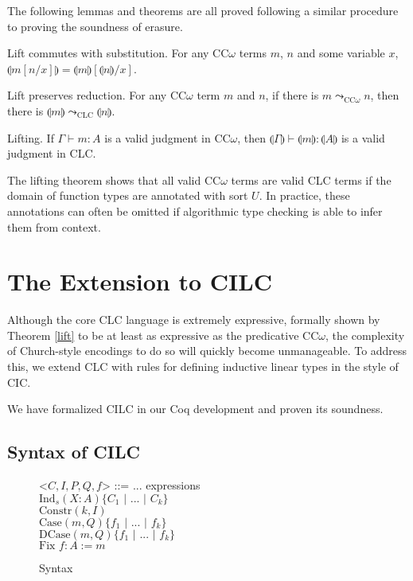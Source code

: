 \documentclass[sigplan,screen,review,authordraft]{acmart}
\newcommand{\indalt}[1][2]{\\\hspace*{-1.2em}\textbar\quad}
\newcommand{\ind}[1]{\text{Ind}_{#1}}
\newcommand{\constr}{\text{Constr}}
\newcommand{\case}{\text{Case}}
\newcommand{\dcase}{\text{DCase}}
\newcommand{\fix}{\text{Fix }}
\newcommand{\sep}{\text{ | }}
\newcommand{\step}{\leadsto}
\newcommand{\lift}[1]{\llparenthesis #1 \rrparenthesis}
\begin{document}
The following lemmas and theorems are all proved following a similar procedure to proving the soundness of erasure.
\begin{lemma}
  Lift commutes with substitution. For any CC$\omega$ terms $m$, $n$ and some variable $x$, $\lift{m[n/x]} = \lift{m}[\lift{n}/x]$.
\end{lemma}

\begin{theorem}
  Lift preserves reduction. For any CC$\omega$ term $m$ and $n$, if there is $m \step_{\scriptscriptstyle \text{CC}\omega} n$, then there is $\lift{m} \step_{\scriptscriptstyle \text{CLC}} \lift{n}$.
\end{theorem}

\begin{theorem} \label{lift}
  Lifting. If $\Gamma \vdash m : A$ is a valid judgment in CC$\omega$, then $\lift{\Gamma} \vdash \lift{m} : \lift{A}$ is a valid judgment in CLC.
\end{theorem}

The lifting theorem shows that all valid CC$\omega$ terms are valid CLC terms if the domain of function types are annotated with sort $U$. In practice, these annotations can often be omitted if algorithmic type checking is able to infer them from context.

\section{The Extension to CILC}
Although the core CLC language is extremely expressive, formally shown by Theorem \ref{lift} to be at least as expressive as the predicative CC$\omega$, the complexity of Church-style encodings to do so will quickly become unmanageable. To address this, we extend CLC with rules for defining inductive linear types in the style of CIC.

We have formalized CILC in our Coq development and proven its soundness.

\subsection{Syntax of CILC}
\begin{figure}[h]
  \caption{Syntax}
  \begin{grammar}
    <$C,I,P,Q,f$> ::= ... \hspace*{10em} expressions
    \indalt $\ind{s}(X : A)\{C_1 \sep ... \sep C_k\}$
    \indalt $\constr(k, I)$
    \indalt $\case(m, Q)\{f_1 \sep ... \sep f_k \}$
    \indalt $\dcase(m, Q)\{f_1 \sep ... \sep f_k \}$
    \indalt $\fix f : A := m$
  \end{grammar}
  \Description{}
  \label{syntax2}
\end{figure}
\end{document}
